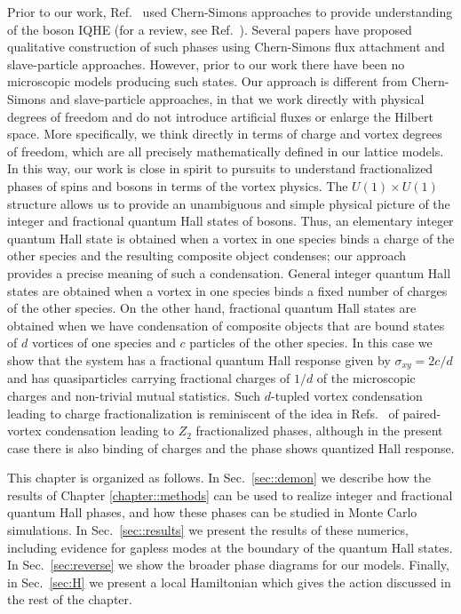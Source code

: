 Prior to our work, Ref.~\cite{LuVishwanath2012} used Chern-Simons approaches to provide understanding of the boson IQHE (for a review, see Ref.~\cite{TurnerVishwanath2013}).  Several papers have proposed qualitative construction of such phases using Chern-Simons flux attachment\cite{SenthilLevin2012} and slave-particle approaches.\cite{GroverVishwanath2012, LuLee2012_QPT, LuLee2012_S1}  However, prior to our work there have been no microscopic models producing such states.
Our approach is different from Chern-Simons and slave-particle approaches, in that we work directly with physical degrees of freedom and do not introduce artificial fluxes or enlarge the Hilbert space.  More specifically, we think directly in terms of charge and vortex degrees of freedom, which are all precisely mathematically defined in our lattice models.  In this way, our work is close in spirit to pursuits to understand fractionalized phases of spins and bosons in terms of the vortex physics.\cite{BalentsFisherNayak1999, SenthilFisher_Z2}  The $U(1) \times U(1)$ structure allows us to provide an unambiguous and simple physical picture of the integer and fractional quantum Hall states of bosons.  Thus, an elementary integer quantum Hall state is obtained when a vortex in one species binds a charge of the other species and the resulting composite object condenses; our approach provides a precise meaning of such a condensation.  General integer quantum Hall states are obtained when a vortex in one species binds a fixed number of charges of the other species.  On the other hand, fractional quantum Hall states are obtained when we have condensation of composite objects that are bound states of $d$ vortices of one species and $c$ particles of the other species.  In this case we show that the system has a fractional quantum Hall response given by $\sigma_{xy} = 2c/d$ and has quasiparticles carrying fractional charges of $1/d$ of the microscopic charges and non-trivial mutual statistics.  Such $d$-tupled vortex condensation leading to charge fractionalization is reminiscent of the idea in Refs.~\cite{BalentsFisherNayak1999, SenthilFisher_Z2} of paired-vortex condensation leading to $Z_2$ fractionalized phases, although in the present case there is also binding of charges and the phase shows quantized Hall response.

This chapter is organized as follows.  In Sec.~\ref{sec::demon} we describe how the results of Chapter \ref{chapter::methods} can be used to realize integer and fractional quantum Hall phases, and how these phases can be studied in Monte Carlo simulations.  In Sec.~\ref{sec::results} we present the results of these numerics, including evidence for gapless modes at the boundary of the quantum Hall states.  In Sec.~\ref{sec:reverse} we show the broader phase diagrams for our models.  
Finally, in Sec.~\ref{sec:H} we present a local Hamiltonian which gives the action discussed in the rest of the chapter.


